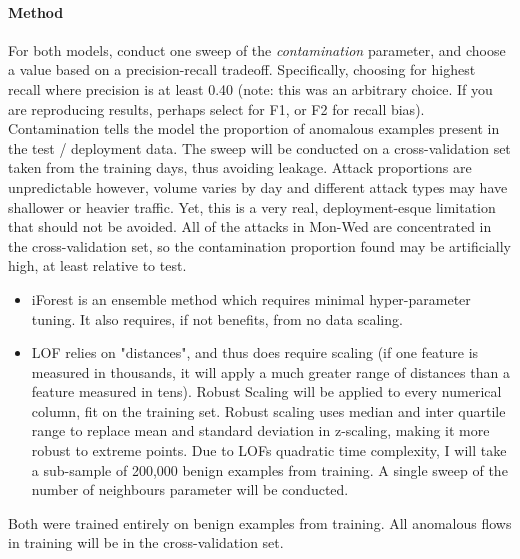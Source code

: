 \documentclass{article}
\begin{document}
\paragraph{Method} For both models, conduct one sweep of the \textit{contamination} parameter, and choose a value based on a precision-recall tradeoff. Specifically, choosing for highest recall where precision is at least 0.40 (note: this was an arbitrary choice. If you are reproducing results, perhaps select for F1, or F2 for recall bias). Contamination tells the model the proportion of anomalous examples present in the test / deployment data. The sweep will be conducted on a cross-validation set taken from the training days, thus avoiding leakage. Attack proportions are unpredictable however, volume varies by day and different attack types may have shallower or heavier traffic. Yet, this is a very real, deployment-esque limitation that should not be avoided. All of the attacks in Mon-Wed are concentrated in the cross-validation set, so the contamination proportion found may be artificially high, at least relative to test.
\begin{itemize}
\item iForest is an ensemble method which requires minimal hyper-parameter tuning. It also requires, if not benefits, from no data scaling.
\item LOF relies on "distances", and thus does require scaling (if one feature is measured in thousands, it will apply a much greater range of distances than a feature measured in tens). Robust Scaling will be applied to every numerical column, fit on the training set. Robust scaling uses median and inter quartile range to replace mean and standard deviation in z-scaling, making it more robust to extreme points. Due to LOFs quadratic time complexity, I will take a sub-sample of 200,000 benign examples from training. A single sweep of the number of neighbours parameter will be conducted.
\end{itemize}
Both were trained entirely on benign examples from training. All anomalous flows in training will be in the cross-validation set.
\begin{table}[H]
\centering
{}
\caption{XGBoost vs. iForest vs. LOF}
\end{table}
\end{document}
